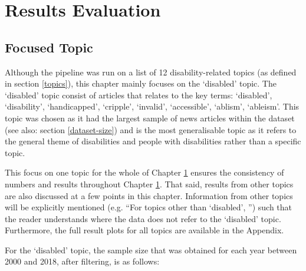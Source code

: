 \documentclass{report}
\begin{document}



\chapter{Results Evaluation} \label{Results Evaluation}  %

\section{Focused Topic} \label{Focused topic}
Although the pipeline was run on a list of 12 disability-related topics (as defined in section \ref{topics}), this chapter mainly focuses on the `disabled' topic.
The `disabled' topic consist of articles that relates to the key terms: `disabled', `disability', `handicapped', `cripple', `invalid', `accessible', `ablism', `ableism'.
This topic was chosen as it had the largest sample of news articles within the dataset (see also: section \ref{dataset-size}) and is the most generalisable topic as it refers to the general theme of disabilities and people with disabilities rather than a specific topic.

This focus on one topic for the whole of Chapter \ref{Results Evaluation} ensures the consistency of numbers and results throughout Chapter \ref{Results Evaluation}.
That said, results from other topics are also discussed at a few points in this chapter.
Information from other topics will be explicitly mentioned (e.g. ``For topics other than `disabled', '') such that the reader understands where the data does not refer to the `disabled' topic.
Furthermore, the full result plots for all topics are available in the Appendix.

For the `disabled' topic, the sample size that was obtained for each year between 2000 and 2018, after filtering, is as follows:
\end{document}
